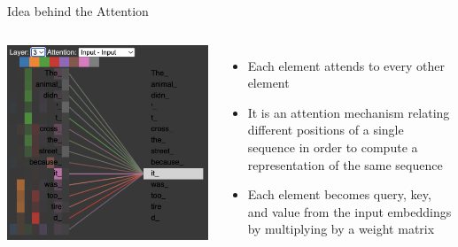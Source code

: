 \documentclass{beamer}
\begin{document}
\begin{frame}{Idea behind the Attention}
\begin{columns}
  \includegraphics[width=1\linewidth]{f12.png}
  \begin{itemize}
      \item Each element attends to every other element
      \item It is an attention mechanism relating different positions of a single sequence in order to compute a representation of the same sequence
      \item Each element becomes query, key, and value from the input embeddings by multiplying by a weight matrix
  \end{itemize}
    
\end{columns}
\renewcommand{\thefootnote}{}
\renewcommand{\thefootnote}{\arabic{footnote}}

\end{frame}
\end{document}
